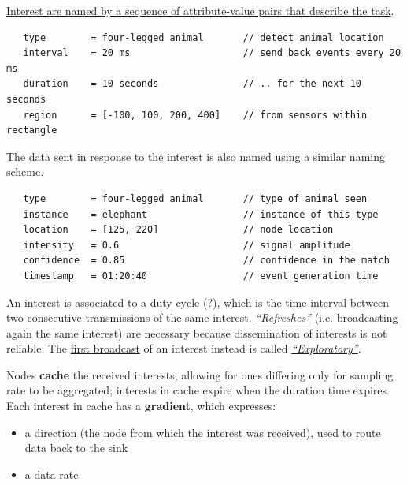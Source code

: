 {\ns\ul{Interest are named by a sequence of attribute-value pairs that describe the task}.
\begin{lstlisting}
   type        = four-legged animal       // detect animal location
   interval    = 20 ms                    // send back events every 20 ms
   duration    = 10 seconds               // .. for the next 10 seconds
   region      = [-100, 100, 200, 400]    // from sensors within rectangle
\end{lstlisting}}
{\ns The data sent in response to the interest is also named using a similar naming scheme.
\begin{lstlisting}
   type        = four-legged animal       // type of animal seen
   instance    = elephant                 // instance of this type
   location    = [125, 220]               // node location
   intensity   = 0.6                      // signal amplitude
   confidence  = 0.85                     // confidence in the match
   timestamp   = 01:20:40                 // event generation time
\end{lstlisting}}

An interest is associated to a duty cycle (?), which is the time interval between two consecutive transmissions of the same interest. \ul{\textit{``Refreshes''}} (i.e. broadcasting again the same interest) are necessary because dissemination of interests is not reliable.
The \ul{first broadcast} of an interest instead is called \ul{\textit{``Exploratory''}}.

Nodes \textbf{cache} the received interests, allowing for ones differing only for sampling rate to be aggregated; interests in cache expire when the duration time expires.\\
Each interest in cache has a \textbf{gradient}, which expresses:
\begin{itemize}
   \item a direction (the node from which the interest was received), used to route data back to the sink
   \item a data rate
\end{itemize}

